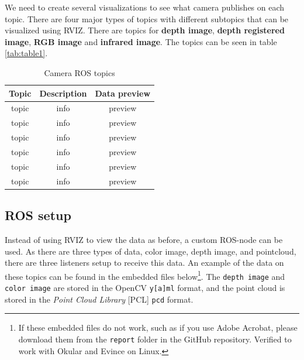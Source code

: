 \documentclass[11pt]{article}
\begin{document}
We need to create several visualizations to see what camera publishes on each topic. There are four major types of topics with different subtopics that can be visualized using RVIZ. There are topics for \textbf{depth image}, \textbf{depth registered image}, \textbf{RGB image} and \textbf{infrared image}.  The topics can be seen in table \vref{tab:table1}. \par
\begin{table}[h!]
  
  \begin{center}
    \caption{Camera ROS topics}
    \label{tab:table1}
    \begin{tabular}{ccc}
      \toprule
      Topic & Description & Data preview\\
      \midrule
      topic & info & preview\\
      topic & info & preview\\
      topic & info & preview\\
      topic & info & preview\\
      topic & info & preview\\
      topic & info & preview\\
      \bottomrule
    \end{tabular}
  \end{center}

\end{table}



\subsection{ROS setup}
Instead of using RVIZ to view the data as before, a custom ROS-node can be used. As there are three types of data, color image, depth image, and pointcloud, there are three listeners setup to receive this data. An example of the data on these topics can be found in the embedded files below\footnote{If these embedded files do not work, such as if you use Adobe Acrobat, please download them from the \texttt{report} folder in the GitHub repository. Verified to work with Okular and Evince on Linux.}. The \texttt{depth image} and \texttt{color image} are stored in the OpenCV \texttt{y[a]ml} format, and the point cloud is stored in the \emph{Point Cloud Library} [PCL] \texttt{pcd} format.\par

\begin{center}
\end{center}
\end{document}
